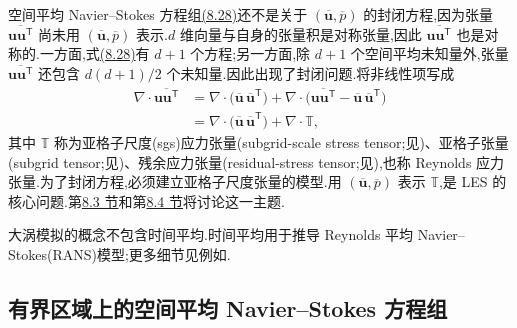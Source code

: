 \begin{note}[非线性项的滤波与封闭问题]
\label{note:les-closure-problem}
空间平均 Navier--Stokes 方程组\hyperref[eq:space-averaged-navier-stokes-full-space]{(8.28)}还不是关于 $(\overline{\bm{u}},\overline{p})$ 的封闭方程,因为张量 $\overline{\bm{u}\bm{u}^{\mathsf T}}$ 尚未用 $(\overline{\bm{u}},\overline{p})$ 表示.$d$ 维向量与自身的张量积是对称张量,因此 $\overline{\bm{u}\bm{u}^{\mathsf T}}$ 也是对称的.一方面,式\hyperref[eq:space-averaged-navier-stokes-full-space]{(8.28)}有 $d+1$ 个方程;另一方面,除 $d+1$ 个空间平均未知量外,张量 $\overline{\bm{u}\bm{u}^{\mathsf T}}$ 还包含 $d(d+1)/2$ 个未知量.因此出现了封闭问题.将非线性项写成
\begin{equation}\label{eq:subgrid-stress-decomposition}
\begin{aligned}
 \nabla\cdot\overline{\bm{u}\bm{u}^{\mathsf T}}
  &=\nabla\cdot
       \bigl(\overline{\bm{u}}\,
             \overline{\bm{u}}^{\mathsf T}\bigr)
    +\nabla\cdot
       \bigl(\overline{\bm{u}\bm{u}^{\mathsf T}}
             -\overline{\bm{u}}\,
              \overline{\bm{u}}^{\mathsf T}\bigr)\\
  &=\nabla\cdot
       \bigl(\overline{\bm{u}}\,
             \overline{\bm{u}}^{\mathsf T}\bigr)
    +\nabla\cdot\mathbb{T},
\end{aligned}
\end{equation}
其中 $\mathbb{T}$ 称为亚格子尺度(sgs)应力张量(subgrid-scale stress tensor;见\textcite{MeneveauKatz2000})、亚格子张量(subgrid tensor;见\textcite[p.~49]{Sagaut2006})、残余应力张量(residual-stress tensor;见\textcite[p.~581]{Pope2000}),也称 Reynolds 应力张量.为了封闭方程,必须建立亚格子尺度张量的模型.用 $(\overline{\bm{u}},\overline{p})$ 表示 $\mathbb{T}$,是 LES 的核心问题.第\hyperref[sec:les-models]{8.3 节}和第\hyperref[sec:les-wave-number-models]{8.4 节}将讨论这一主题.
\end{note}

\begin{note}[时间平均]
\label{note:time-averaging-not-les}
大涡模拟的概念不包含时间平均.时间平均用于推导 Reynolds 平均 Navier--Stokes(RANS)模型;更多细节见例如\textcite[Sect.~9.4]{FerzigerPeric1999}.
\end{note}

\subsection{有界区域上的空间平均 Navier--Stokes 方程组}
\label{subsec:les-space-averaged-equations-bounded-domain}

